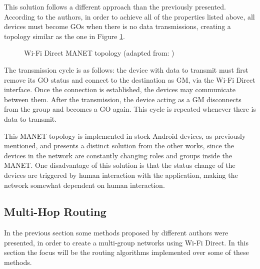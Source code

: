 This solution follows a different approach than the previously presented. According to the authors, in order to achieve all of the properties listed above, all devices must become \glspl{GO} when there is no data transmissions, creating a topology similar as the one in Figure \ref{fig:manettop}.

\begin{figure}[ht]
	\noindent{}
	\caption{\label{fig:manettop} Wi-Fi Direct MANET topology (adapted from: \cite{manet})}
\end{figure}

The transmission cycle is as follows: the device with data to transmit must first remove its \gls{GO} status and connect to the destination as \gls{GM}, via the Wi-Fi Direct interface. Once the connection is established, the devices may communicate between them. After the transmission, the device acting as a \gls{GM} disconnects from the group and becomes a \gls{GO} again. This cycle is repeated whenever there is data to transmit.

This \gls{MANET} topology is implemented in stock Android devices, as previously mentioned, and presents a distinct solution from the other works, since the devices in the network are constantly changing roles and groups inside the \gls{MANET}. One disadvantage of this solution is that the status change of the devices are triggered by human interaction with the application, making the network somewhat dependent on human interaction.

\subsection{Multi-Hop Routing}
\label{subsection:mhoprouting}

In the previous section some methods proposed by different authors were presented, in order to create a multi-group networks using Wi-Fi Direct. In this section the focus will be the routing algorithms implemented over some of these methods.


